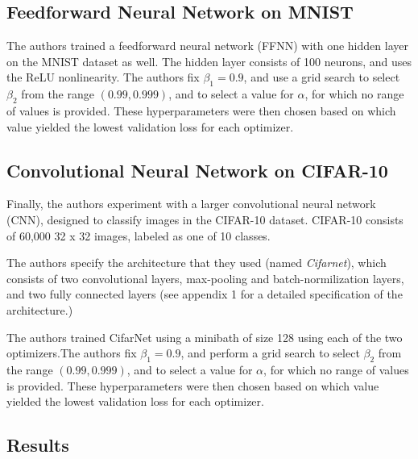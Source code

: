 \documentclass[letterpaper, 10 pt, conference]{ieeeconf}  %
\begin{document}
\subsection{Feedforward Neural Network on MNIST}

The authors trained a feedforward neural network (FFNN) with one hidden layer on the MNIST dataset as well. The hidden layer consists of 100 neurons, and uses the ReLU nonlinearity. The authors fix $\beta_{1} = 0.9$, and use a grid search to select $\beta_{2}$ from the range $(0.99, 0.999)$, and to select a value for $\alpha$, for which no range of values is provided. These hyperparameters were then chosen based on which value yielded the lowest validation loss for each optimizer. 

\subsection{Convolutional Neural Network on CIFAR-10}

Finally, the authors experiment with a larger convolutional neural network (CNN), designed to classify images in the CIFAR-10 dataset. CIFAR-10 consists of 60,000  32 x 32 images, labeled as one of 10 classes.

The authors specify the architecture that they used (named \emph{Cifarnet}), which consists of two convolutional layers, max-pooling and batch-normilization layers, and two fully connected layers (see appendix 1 for a detailed specification of the architecture.)

The authors trained CifarNet using a minibath of size 128 using each of the two optimizers.The authors fix $\beta_{1} = 0.9$, and perform a grid search to select $\beta_{2}$ from the range $(0.99, 0.999)$, and to select a value for $\alpha$, for which no range of values is provided. These hyperparameters were then chosen based on which value yielded the lowest validation loss for each optimizer. 

\subsection{Results}
\end{document}

